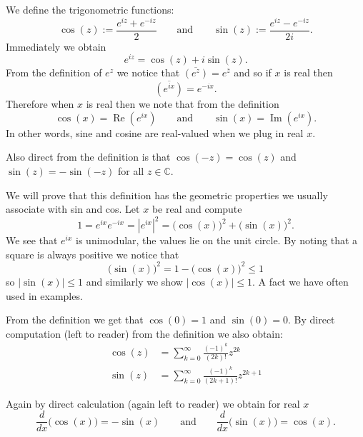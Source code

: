 \documentclass[12pt]{book}
\renewcommand{\Re}{\operatorname{Re}}
\renewcommand{\Im}{\operatorname{Im}}
\newcommand{\abs}[1]{\left\lvert {#1} \right\rvert}
\newcommand{\C}{{\mathbb{C}}}
\theoremstyle{plain}
\theoremstyle{remark}
\theoremstyle{definition}
\theoremstyle{exercise}
\theoremstyle{example}
\begin{document}

We define the trigonometric functions:
\begin{equation*}
\cos(z) := \frac{e^{iz} + e^{-iz}}{2}
\qquad\text{and}\qquad
\sin(z) := \frac{e^{iz} - e^{-iz}}{2i} .
\end{equation*}
Immediately we obtain
\begin{equation*}
e^{iz} = \cos(z) + i\sin(z) .
\end{equation*}
From the definition of $e^z$ we notice that
$\overline{(e^z)} = e^{\bar{z}}$ and so
if $x$ is real then
\begin{equation*}
\overline{(e^{ix})} = e^{-ix} .
\end{equation*}
Therefore when $x$ is real then we note that from the definition
\begin{equation*}
\cos(x) = \Re (e^{ix})
\qquad\text{and}\qquad
\sin(x) = \Im (e^{ix}) .
\end{equation*}
In other words, sine and cosine are real-valued when we plug in real $x$.

Also direct from the definition is that $\cos(-z) = \cos(z)$ and
$\sin(z) = -\sin(-z)$ for all $z \in \C$.

We will prove that this definition has the geometric properties we usually
associate with sin and cos.  Let $x$ be real and compute
$$
1 =  e^{ix} e^{-ix} = \abs{e^{ix}}^2 = {\bigl( \cos(x) \bigr)}^2 + {\bigl( \sin(x) \bigr)}^2 .
$$
We see that $e^{ix}$ is unimodular, the values lie on the unit circle.  By
noting that a square is always positive we notice that
$$
{\bigl(\sin(x)\bigr)}^2 = 1-{\bigl(\cos(x)\bigr)}^2 \leq 1
$$
so $\abs{\sin(x)} \leq 1$ and similarly we show
$\abs{\cos(x)} \leq 1$.  A fact we have often used in examples.

From the definition we get that $\cos(0) = 1$ and $\sin(0) = 0$.  By direct
computation (left to reader) from the definition we also obtain:
\begin{align*}
\cos(z) &= \sum_{k=0}^\infty \frac{{(-1)}^k}{(2k)!} z^{2k}
\\
\sin(z) &= \sum_{k=0}^\infty \frac{{(-1)}^k}{(2k+1)!} z^{2k+1}
\end{align*}

Again by direct calculation (again left to reader) we obtain
for real $x$
\begin{equation*}
\frac{d}{dx} \bigl( \cos(x) \bigr) = -\sin(x)
\qquad \text{and} \qquad
\frac{d}{dx} \bigl( \sin(x) \bigr) = \cos(x) .
\end{equation*}
\end{document}
